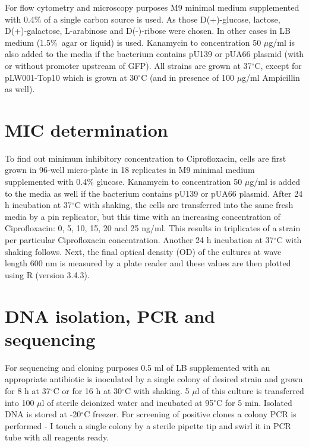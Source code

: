 For flow cytometry and microscopy purposes M9 minimal medium supplemented with 0.4\% of a single carbon source is used.
As those D(+)-glucose, lactose, D(+)-galactose, L-arabinose and D(-)-ribose were chosen.
In other cases in LB medium (1.5\%~agar or liquid) is used.
Kanamycin to concentration 50 $\mu$g/ml is also added to the media if the bacterium contains pU139 or pUA66 plasmid (with or without promoter upstream of GFP).
All strains are grown at 37$^{\circ}$C, except for pLW001-Top10 which is grown at 30$^{\circ}$C (and in presence of 100 $\mu$g/ml Ampicillin as well).


\hypertarget{MIC}{\section{MIC determination}}
To find out minimum inhibitory concentration to Ciprofloxacin, cells are first grown in 96-well micro-plate in 18 replicates in M9 minimal medium supplemented with 0.4\% glucose.
Kanamycin to concentration 50 $\mu$g/ml is added to the media as well if the bacterium contains pU139 or pUA66 plasmid.
After 24 h incubation at 37$^{\circ}$C with shaking, the cells are transferred into the same fresh media by a pin replicator, but this time with an increasing concentration of Ciprofloxacin: 0, 5, 10, 15, 20 and 25 ng/ml.
This results in triplicates of a strain per particular Ciprofloxacin concentration.
Another 24 h incubation at 37$^{\circ}$C with shaking follows.
Next, the final optical density (OD) of the cultures at wave length 600 nm is measured by a plate reader and these values are then plotted using R (version 3.4.3).


\section{DNA isolation, PCR and sequencing}
For sequencing and cloning purposes 0.5 ml of LB supplemented with an appropriate antibiotic is inoculated by a single colony of desired strain and grown for 8 h at 37$^{\circ}$C or for 16 h at 30$^{\circ}$C with shaking.
5 $\mu$l of this culture is transferred into 100 $\mu$l of sterile deionized water and incubated at 95$^{\circ}$C for 5 min.
Isolated DNA is stored at -20$^{\circ}$C freezer.
For screening of positive clones a colony PCR is performed - I touch a single colony by a sterile pipette tip and swirl it in PCR tube with all reagents ready.

